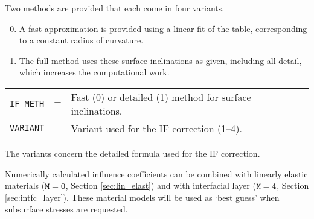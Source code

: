 \documentclass[12pt]{report}
\renewcommand{\magenta}[1]{}
\newenvironment{inputvars}{\vspace{0.4\baselineskip}%

\begin{tabular}{>{\raggedright}p{22mm}p{19mm}p{113mm}}}{
\end{tabular}

}
\newcommand{\inpvar}[3]{{\small\tt #1} & $#2$ & #3 \\[1ex]}
\begin{document}
Two methods are provided that each come in four variants. 
\begin{enumerate}\setcounter{enumi}{-1}
\item A fast approximation is provided using a linear fit of the table,
        corresponding to a constant radius of curvature.
\item The full method uses these surface inclinations as given,
        including all detail, which increases the computational work.
\end{enumerate}
\begin{inputvars}
\inpvar{IF\_METH}{-}{Fast (0) or detailed (1) method for surface
        inclinations.}
\inpvar{VARIANT}{-}{Variant used for the IF correction (1--4).}
\end{inputvars}
The variants concern the detailed formula used for the IF correction.
\magenta{
\begin{enumerate}
\item Blanco-proposal, decomposing pressures $\vec{p}$;
\item same, without $B_{xn}$ correction;
\item Vollebregt-proposal, transforming displacements $\vec{u}$;
\item Combined proposal, using $\vec{p}$ and $\vec{u}$.
\end{enumerate}
}

Numerically calculated influence coefficients can be combined with linearly
elastic materials (${\tt M}=0$, Section \ref{sec:lin_elast}) and with
interfacial layer (${\tt M}=4$, Section \ref{sec:intfc_layer}). These
material models will be used as `best guess' when subsurface stresses
are requested.
\end{document}
